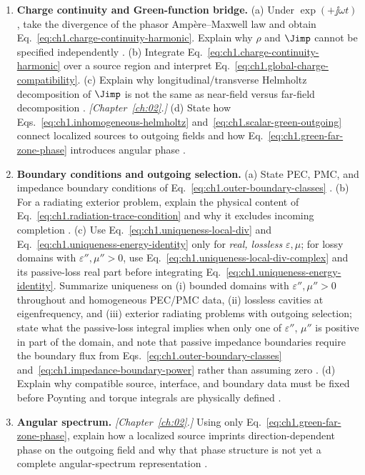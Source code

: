 \begin{enumerate}
\item \textbf{Charge continuity and Green-function bridge.}
(a) Under $\exp(+\jj\omega t)$, take the divergence of the phasor Amp\`ere--Maxwell law and obtain Eq.~\eqref{eq:ch1.charge-continuity-harmonic}. Explain why $\rho$ and $\Jimp$ cannot be specified independently \cite{maxwell1873,stratton1941}.
(b) Integrate Eq.~\eqref{eq:ch1.charge-continuity-harmonic} over a source region and interpret Eq.~\eqref{eq:ch1.global-charge-compatibility}.
(c) Explain why longitudinal/transverse Helmholtz decomposition of $\Jimp$ is not the same as near-field versus far-field decomposition \cite{stratton1941,jackson1999}. \emph{[Chapter~\ref{ch:02}.]}
(d) State how Eqs.~\eqref{eq:ch1.inhomogeneous-helmholtz} and~\eqref{eq:ch1.scalar-green-outgoing} connect localized sources to outgoing fields and how Eq.~\eqref{eq:ch1.green-far-zone-phase} introduces angular phase \cite{tai1994,stratton1941}.

\item \textbf{Boundary conditions and outgoing selection.}
(a) State PEC, PMC, and impedance boundary conditions of Eq.~\eqref{eq:ch1.outer-boundary-classes} \cite{stratton1941}.
(b) For a radiating exterior problem, explain the physical content of Eq.~\eqref{eq:ch1.radiation-trace-condition} and why it excludes incoming completion \cite{sommerfeld1949,stratton1941}.
(c) Use Eq.~\eqref{eq:ch1.uniqueness-local-div} and Eq.~\eqref{eq:ch1.uniqueness-energy-identity} only for \emph{real, lossless} $\varepsilon,\mu$; for lossy domains with $\varepsilon'',\mu''>0$, use Eq.~\eqref{eq:ch1.uniqueness-local-div-complex} and its passive-loss real part before integrating Eq.~\eqref{eq:ch1.uniqueness-energy-identity}. Summarize uniqueness on (i) bounded domains with $\varepsilon'',\mu''>0$ throughout and homogeneous PEC/PMC data, (ii) lossless cavities at eigenfrequency, and (iii) exterior radiating problems with outgoing selection; state what the passive-loss integral implies when only one of $\varepsilon''$, $\mu''$ is positive in part of the domain, and note that passive impedance boundaries require the boundary flux from Eqs.~\eqref{eq:ch1.outer-boundary-classes} and~\eqref{eq:ch1.impedance-boundary-power} rather than assuming zero \cite{stratton1941,harrington2001}.
(d) Explain why compatible source, interface, and boundary data must be fixed before Poynting and torque integrals are physically defined \cite{harrington2001}.

\item \textbf{Angular spectrum.}
\emph{[Chapter~\ref{ch:02}.]} Using only Eq.~\eqref{eq:ch1.green-far-zone-phase}, explain how a localized source imprints direction-dependent phase on the outgoing field and why that phase structure is not yet a complete angular-spectrum representation \cite{stratton1941,silver1949}.


\end{enumerate}
